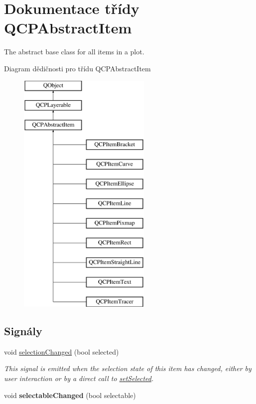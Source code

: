 \hypertarget{classQCPAbstractItem}{}\section{Dokumentace třídy Q\+C\+P\+Abstract\+Item}
\label{classQCPAbstractItem}


The abstract base class for all items in a plot.  


Diagram dědičnosti pro třídu Q\+C\+P\+Abstract\+Item\begin{figure}[H]
\begin{center}
\leavevmode
\includegraphics[height=12.000000cm]{classQCPAbstractItem}
\end{center}
\end{figure}
\subsection*{Signály}
\begin{DoxyCompactItemize}
\item 
\hypertarget{classQCPAbstractItem_aa5cffb034fc65dbb91c77e02c1c14251}{}void \hyperlink{classQCPAbstractItem_aa5cffb034fc65dbb91c77e02c1c14251}{selection\+Changed} (bool selected)\label{classQCPAbstractItem_aa5cffb034fc65dbb91c77e02c1c14251}

\begin{DoxyCompactList}\small\item\em This signal is emitted when the selection state of this item has changed, either by user interaction or by a direct call to \hyperlink{classQCPAbstractItem_a203de94ad586cc44d16c9565f49d3378}{set\+Selected}. \end{DoxyCompactList}\item 
\hypertarget{classQCPAbstractItem_a5b266c11aac61cb511901f3911dac2a3}{}void {\bfseries selectable\+Changed} (bool selectable)\label{classQCPAbstractItem_a5b266c11aac61cb511901f3911dac2a3}

\end{DoxyCompactItemize}

